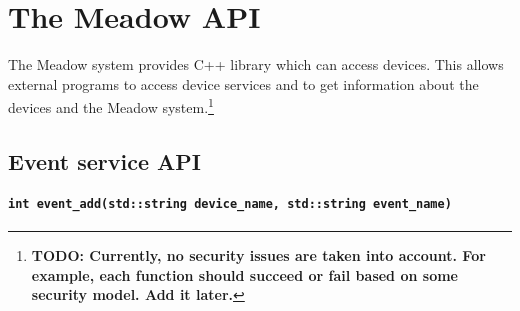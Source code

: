 \documentclass{note}
\begin{document}



\section{The Meadow API}
The Meadow system provides C++ library which can access devices. 
This allows external programs to access device services and to get information
about the devices and the Meadow
system.\footnote{\textcolor{green2}{\bf{}TODO: Currently, no
    security issues are taken into account. For example, each function should
    succeed or fail based on some security model. Add it later.}}

\subsection{Event service API}
\paragraph{\small\textcolor{red2}{\tt{}int event\_add(std::string device\_name, std::string event\_name)}}
\end{document}
